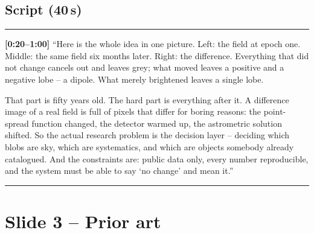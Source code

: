 \documentclass[11pt,a4paper]{article}
\begin{document}
\begin{center}
\end{center}

\subsection*{Script (40\,s)}
\noindent\rule{\linewidth}{0.3pt}\par\smallskip\noindent
\textbf{[0:20--1:00]} ``Here is the whole idea in one picture. Left: the field at epoch one. Middle: the
same field six months later. Right: the difference. Everything that did not change cancels out and
leaves grey; what moved leaves a positive and a negative lobe -- a dipole. What merely brightened
leaves a single lobe.

That part is fifty years old. The hard part is everything after it. A difference image of a real field
is full of pixels that differ for boring reasons: the point-spread function changed, the detector
warmed up, the astrometric solution shifted. So the actual research problem is the decision layer --
deciding which blobs are sky, which are systematics, and which are objects somebody already
catalogued. And the constraints are: public data only, every number reproducible, and the system must
be able to say `no change' and mean it.''
\par\smallskip\noindent\rule{\linewidth}{0.3pt}

\section{Slide 3 -- Prior art}
\end{document}
